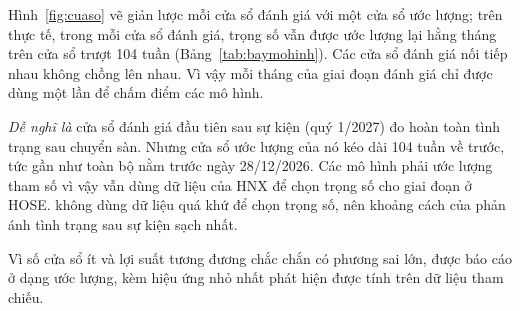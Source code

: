 Hình~\ref{fig:cuaso} vẽ giản lược mỗi cửa sổ đánh giá với một cửa sổ ước lượng; trên thực tế, trong mỗi cửa sổ đánh giá, trọng số vẫn được ước lượng lại hằng tháng trên cửa sổ trượt 104 tuần (Bảng~\ref{tab:baymohinh}). Các cửa sổ đánh giá nối tiếp nhau không chồng lên nhau. Vì vậy mỗi tháng của giai đoạn đánh giá chỉ được dùng một lần để chấm điểm các mô hình.

\begin{delam}
\emph{Dễ nghĩ là} cửa sổ đánh giá đầu tiên sau sự kiện (quý 1/2027) đo hoàn toàn tình trạng sau chuyển sàn. Nhưng cửa sổ ước lượng của nó kéo dài 104 tuần về trước, tức gần như toàn bộ nằm trước ngày 28/12/2026. Các mô hình phải ước lượng tham số vì vậy vẫn dùng dữ liệu của HNX để chọn trọng số cho giai đoạn ở HOSE.  không dùng dữ liệu quá khứ để chọn trọng số, nên khoảng cách của  phản ánh tình trạng sau sự kiện sạch nhất.
\end{delam}

Vì số cửa sổ ít và lợi suất tương đương chắc chắn có phương sai lớn,  được báo cáo ở dạng ước lượng, kèm hiệu ứng nhỏ nhất phát hiện được tính trên dữ liệu tham chiếu.
